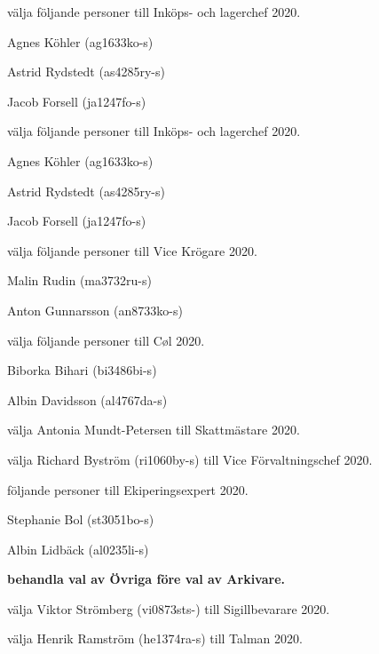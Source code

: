 \documentclass[10pt]{article}
\begin{document}
\begin{paragrafer}
\begin{paralist}
    \Mba välja följande personer till Inköps- och lagerchef 2020.
    \begin{tightdashlist}
        \item Agnes Köhler (ag1633ko-s)
        \item Astrid Rydstedt (as4285ry-s)
        \item Jacob Forsell (ja1247fo-s)
    \end{tightdashlist}

    
    \Mba välja följande personer till Inköps- och lagerchef 2020.
    \begin{tightdashlist}
        \item Agnes Köhler (ag1633ko-s)
        \item Astrid Rydstedt (as4285ry-s)
        \item Jacob Forsell (ja1247fo-s)
    \end{tightdashlist}

    \Mba välja följande personer till Vice Krögare 2020.
    \begin{tightdashlist}
        \item Malin Rudin (ma3732ru-s)
        \item Anton Gunnarsson (an8733ko-s)
    \end{tightdashlist}

    \Mba välja följande personer till Cøl 2020.
    \begin{tightdashlist}
        \item Biborka Bihari (bi3486bi-s)
        \item Albin Davidsson (al4767da-s)
    \end{tightdashlist}

    \Mba välja Antonia Mundt-Petersen till Skattmästare 2020.

    \Mba välja Richard Byström (ri1060by-s) till Vice Förvaltningschef 2020.

    \Mba följande personer till Ekiperingsexpert 2020.
    \begin{tightdashlist}
        \item Stephanie Bol (st3051bo-s)
        \item Albin Lidbäck (al0235li-s)
    \end{tightdashlist}
    
    \textbf{\Mba behandla val av Övriga före val av Arkivare.}

    \Mba välja Viktor Strömberg (vi0873sts-) till Sigillbevarare 2020.

    \Mba välja Henrik Ramström (he1374ra-s) till Talman 2020. 


\end{paralist}
\end{paragrafer}
\end{document}
